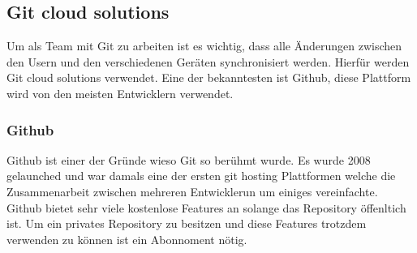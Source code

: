 \subsection{Git cloud solutions}

Um als Team mit Git zu arbeiten ist es wichtig, dass alle Änderungen zwischen den Usern und den verschiedenen Geräten synchronisiert werden. Hierfür werden Git cloud solutions verwendet. Eine der bekanntesten ist Github, diese Plattform wird von den meisten Entwicklern verwendet.

\subsubsection{Github}

Github ist einer der Gründe wieso Git so berühmt wurde. Es wurde 2008 gelaunched und war damals eine der ersten git hosting Plattformen welche die Zusammenarbeit zwischen mehreren Entwicklerun um einiges vereinfachte. Github bietet sehr viele kostenlose Features an solange das Repository öffenltich ist. Um ein privates Repository zu besitzen und diese Features trotzdem verwenden zu können ist ein Abonnoment nötig.

\cite{Github_1}
\cite{Github_2}